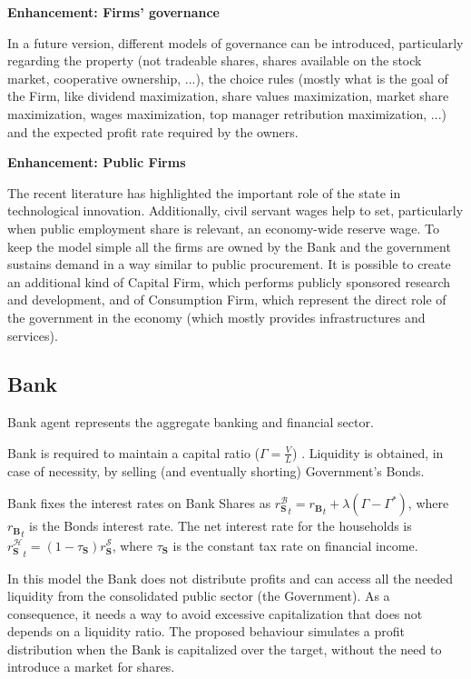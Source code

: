 \documentclass[a4paper, headings=standardclasses]{scrartcl}
\numberwithin{equation}{subsection}
\newenvironment{enh}[1][]{\begin{framed}\noindent\textbf{Enhancement: #1}\par}{\end{framed}}
\begin{document}
\begin{enh}[Firms' governance]
    In a future version, different models of governance can be introduced, particularly regarding the property (not tradeable shares, shares available on the stock market, cooperative ownership, ...), the choice rules (mostly what is the goal of the Firm, like dividend maximization, share values maximization, market share maximization, wages maximization, top manager retribution maximization, ...) and the expected profit rate required by the owners.
\end{enh}

\begin{enh}[Public Firms]
    The recent literature has highlighted the important role of the state in technological innovation. Additionally, civil servant wages help to set, particularly when public employment share is relevant, an economy-wide reserve wage.
    To keep the model simple all the firms are owned by the Bank and the government sustains demand in a way similar to public procurement.
    It is possible to create an additional kind of Capital Firm, which performs publicly sponsored research and development, and of Consumption Firm, which represent the direct role of the government in the economy (which mostly provides infrastructures and services).
\end{enh}


\subsection{Bank}
Bank agent represents the aggregate banking and financial sector.

Bank is required to maintain a capital ratio ($\Gamma = \frac{V}{L}$) \parencite[see][]{caiani2016}. Liquidity is obtained, in case of necessity, by selling (and eventually shorting) Government's Bonds.

Bank fixes the interest rates on Bank Shares as ${r_\mathbf{S}^\mathcal{B}}_t = {r_\mathbf{B}}_t + \lambda(\Gamma - \Gamma^*)$, where ${r_\mathbf{B}}_t$ is the Bonds interest rate. The net interest rate for the households is ${r^\mathcal{H}_\mathbf{S}}_t = (1-\tau_\mathbf{S}) r^\mathcal{S}_\mathbf{S}$, where $\tau_\mathbf{S}$ is the constant tax rate on financial income.

In this model the Bank does not distribute profits and can access all the needed liquidity from the consolidated public sector (the Government). As a consequence, it needs a way to avoid excessive capitalization that does not depends on a liquidity ratio. The proposed behaviour simulates a profit distribution when the Bank is capitalized over the target, without the need to introduce a market for shares.
\end{document}
